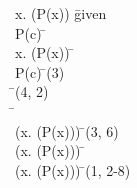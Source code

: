 \documentclass{article}
\begin{document}
\begin{proofbox}
\: \exists x. (\lnot P(x)) \= \hbox{given} \\
\open
\: \lnot P(c) \= \asm \\
\open
\: \forall x. (P(x)) \= \asm \\
\: P(c) \= \forallelim(3) \\
\: \bot \= \bottomintro(4, 2) \\
\: \bot \=  \\
\close
\: \lnot (\forall x. (P(x))) \= \notintro(3, 6) \\
\: \lnot (\forall x. (P(x))) \=  \\
\close
\: \lnot (\forall x. (P(x))) \= \existselim(1, 2-8) \\
\end{proofbox}
\end{document}
